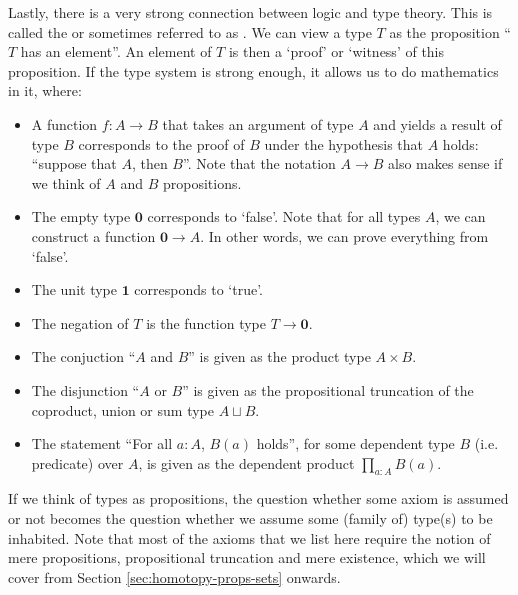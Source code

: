 Lastly, there is a very strong connection between logic and type theory. This is called the  or sometimes referred to as . We can view a type $ T $ as the proposition ``$ T $ has an element''. An element of $ T $ is then a `proof' or `witness' of this proposition. If the type system is strong enough, it allows us to do mathematics in it, where:
\begin{itemize}
  \item A function $ f: A \to B $ that takes an argument of type $ A $ and yields a result of type $ B $ corresponds to the proof of $ B $ under the hypothesis that $ A $ holds: ``suppose that $ A $, then $ B $''. Note that the notation $ A \to B $ also makes sense if we think of $ A $ and $ B $ propositions.
  \item The empty type $ \mathbf 0 $ corresponds to `false'. Note that for all types $ A $, we can construct a function $ \mathbf 0 \to A $. In other words, we can prove everything from `false'.
  \item The unit type $ \mathbf 1 $ corresponds to `true'.
  \item The negation of $ T $ is the function type $ T \to \mathbf 0 $.
  \item The conjuction ``$ A $ and $ B $'' is given as the product type $ A \times B $.
  \item The disjunction ``$ A $ or $ B $'' is given as the propositional truncation of the coproduct, union or sum type $ A \sqcup B $.
  \item The statement ``For all $ a: A $, $ B(a) $ holds'', for some dependent type $ B $ (i.e. predicate) over $ A $, is given as the dependent product $ \prod_{a: A} B(a) $.
\end{itemize}
If we think of types as propositions, the question whether some axiom is assumed or not becomes the question whether we assume some (family of) type(s) to be inhabited. Note that most of the axioms that we list here require the notion of mere propositions, propositional truncation and mere existence, which we will cover from Section \ref{sec:homotopy-props-sets} onwards.

